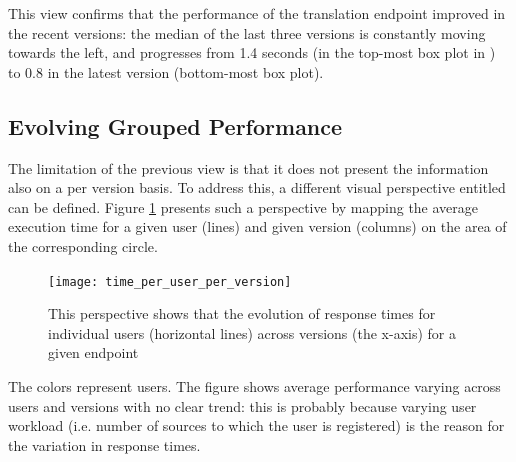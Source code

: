   This view confirms that the performance of the translation endpoint improved in the recent versions: the median of the last three versions is constantly moving towards the left, and progresses from 1.4 seconds (in the top-most box plot in ) to 0.8 in the latest version (bottom-most box plot).


\subsection*{Evolving Grouped Performance}
  The limitation of the previous view is that it does not present the information also on a per version basis. To address this, a different visual perspective entitled  can be defined. Figure \ref{fig:tuv} presents such a perspective by mapping the average execution time for a given user (lines) and given version (columns) on the area of the corresponding circle. 

\begin{figure}[h!]
  \centering
  \texttt{[image: time\_per\_user\_per\_version]}
  \caption{This perspective shows that the evolution of response times for individual users (horizontal lines) across versions (the x-axis) for a given endpoint}
  \label{fig:tuv}
\end{figure}


The colors represent users. The figure shows average performance varying  across users and versions with no clear trend: this is probably because varying user workload (i.e. number of sources to which the user is registered) is the reason for the variation in response times. 


  
